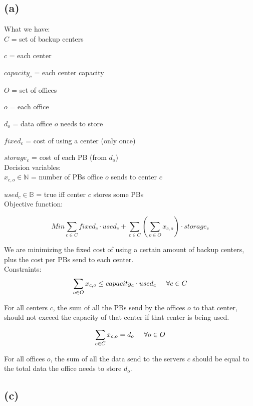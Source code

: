 \documentclass[11pt, oneside]{article}   	%
\begin{document}
\subsection{(a)}

\hspace{\parindent}What we have:\\

$C$ = set of backup centers

$c$ = each center

$capacity_c$ = each center capacity

$O$ = set of offices

$o$ = each office

$d_o$ = data office $o$ needs to store

$fixed_c$ = cost of using a center (only once)

$storage_c$ = cost of each PB (from $d_o$)\\

Decision variables:\\

$x_{c,o} \in \mathbb{N}$ = number of PBs office $o$ sends to center $c$

$used_c \in \mathbb{B}$ = true iff center $c$ stores some PBs\\

Objective function:

$$Min \sum_{c \in C} fixed_c \cdot used_c + \sum_{c \in C} (\sum_{o \in O} x_{c,o}) \cdot storage_c$$

We are minimizing the fixed cost of using a certain amount of backup centers, plus the cost per PBs send to each center.\\

Constraints:\\

$$\sum_{o \in O} x_{c,o} \leq capacity_c \cdot used_c \hspace{5 mm} \forall c \in C$$

For all centers $c$, the sum of all the PBs send by the offices $o$ to that center, should not exceed the capacity of that center if that center is being used.

$$\sum_{c \in C} x_{c,o} = d_o \hspace{5 mm} \forall o \in O$$

For all offices $o$, the sum of all the data send to the servers $c$ should be equal to the total data the office needs to store $d_o$.\\

\subsection{(c)}
\end{document}
